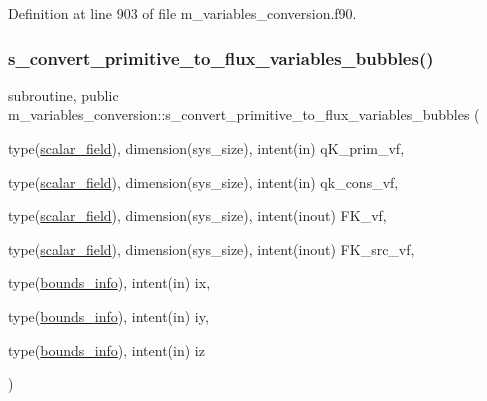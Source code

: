 Definition at line 903 of file m\+\_\+variables\+\_\+conversion.\+f90.

\mbox{\label{namespacem__variables__conversion_ac02f08709876d8ef71c8f8db47a4efa3}} 
\subsubsection{\texorpdfstring{s\+\_\+convert\+\_\+primitive\+\_\+to\+\_\+flux\+\_\+variables\+\_\+bubbles()}{s\_convert\_primitive\_to\_flux\_variables\_bubbles()}}
{\footnotesize\ttfamily subroutine, public m\+\_\+variables\+\_\+conversion\+::s\+\_\+convert\+\_\+primitive\+\_\+to\+\_\+flux\+\_\+variables\+\_\+bubbles (\begin{DoxyParamCaption}\item[{type(\hyperlink{structm__derived__types_1_1scalar__field}{scalar\+\_\+field}), dimension(sys\+\_\+size), intent(in)}]{q\+K\+\_\+prim\+\_\+vf,  }\item[{type(\hyperlink{structm__derived__types_1_1scalar__field}{scalar\+\_\+field}), dimension(sys\+\_\+size), intent(in)}]{qk\+\_\+cons\+\_\+vf,  }\item[{type(\hyperlink{structm__derived__types_1_1scalar__field}{scalar\+\_\+field}), dimension(sys\+\_\+size), intent(inout)}]{F\+K\+\_\+vf,  }\item[{type(\hyperlink{structm__derived__types_1_1scalar__field}{scalar\+\_\+field}), dimension(sys\+\_\+size), intent(inout)}]{F\+K\+\_\+src\+\_\+vf,  }\item[{type(\hyperlink{structm__derived__types_1_1bounds__info}{bounds\+\_\+info}), intent(in)}]{ix,  }\item[{type(\hyperlink{structm__derived__types_1_1bounds__info}{bounds\+\_\+info}), intent(in)}]{iy,  }\item[{type(\hyperlink{structm__derived__types_1_1bounds__info}{bounds\+\_\+info}), intent(in)}]{iz }\end{DoxyParamCaption})}



